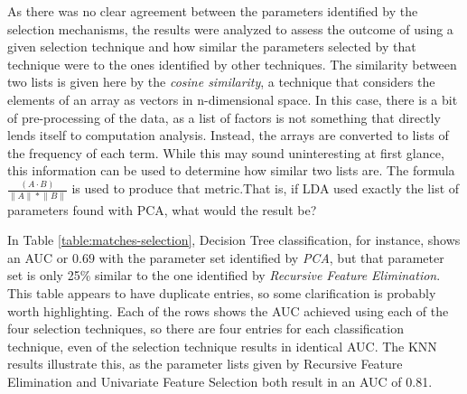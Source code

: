 \documentclass[letterpaper]{report}
\begin{document}
As there was no clear agreement between the parameters identified by the selection mechanisms, the results were analyzed to assess the outcome of using a given selection technique and how similar the parameters selected by that technique were to the ones identified by other techniques.  The similarity between two lists is given here by the \textit{cosine similarity}, a technique that considers the elements of an array as vectors in n-dimensional space. In this case, there is a bit of pre-processing of the data, as a list of factors is not something that directly lends itself to computation analysis. Instead, the arrays are converted to lists of the frequency of each term. While this may sound uninteresting at first glance, this information can be used to determine how similar two lists are. The formula $\frac {(A \cdot B)} { \lVert A \rVert * \lVert B \rVert }$ is used to produce that metric.That is, if LDA used exactly the list of parameters found with PCA, what would the result be?

In Table \ref{table:matches-selection}, Decision Tree classification, for instance, shows an AUC or $0.69$ with the parameter set identified by \textit{PCA}, but that parameter set is only 25\% similar to the one identified by \textit{Recursive Feature Elimination}.  This table appears to have duplicate entries, so some clarification is probably worth highlighting. Each of the rows shows the AUC achieved using each of the four selection techniques, so there are four entries for each classification technique, even of the selection technique results in identical AUC. The KNN results illustrate this, as the parameter lists given by Recursive Feature Elimination and Univariate Feature Selection both result in an AUC of 0.81.
\end{document}

